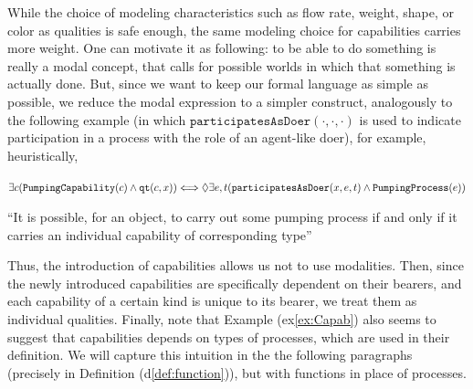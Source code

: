 \documentclass[sw]{iosart2x}
\newcommand{\bflist}{\begin{list}{}{\setlength{\topsep}{2mm}\setlength{\partopsep}{0mm}\setlength{\parsep}{0mm}\setlength{\leftmargin}{9mm}\setlength{\labelwidth}{8mm}}}
\newcommand{\eflist}{\end{list}}
\newcommand{\DefLabel}{\textrm{d}}
\newcommand{\ExLabel}{\textrm{ex}}
\newcommand{\myex}[1]{\refstepcounter{cntex}\begin{small}{\bf \ExLabel\thecntex\label{ex:#1}}\end{small}}
\newcounter{cntex}
\newcommand{\mytext}[1]{``#1''}
\newcommand{\refdf}[1]{({\DefLabel}\ref{#1})}
\newcommand{\refex}[1]{({\ExLabel}\ref{#1})}
\newcommand{\generalStyle}[1]{\texttt{#1}}
\newcommand{\biRel}[3]{\generalStyle{#1}(#2,#3)}
\newcommand{\uniRel}[2]{\generalStyle{#1}(#2)}
\newcommand{\triRel}[4]{\generalStyle{#1}(#2,#3,#4)}
\newcommand{\myiff}{\Longleftrightarrow}
\newcommand{\DOLCEQualityDirect}[2]{\biRel{qt}{#1}{#2}}
\newcommand{\PumpingCapability}[1]{\uniRel{PumpingCapability}{#1}}
\newcommand{\PumpingProcess}[1]{\uniRel{PumpingProcess}{#1}}
\newcommand{\participateAsDoer}[3]{\triRel{participatesAsDoer}{#1}{#2}{#3}}
\newcommand{\TODO}[1]{{\color{red} #1}}
\begin{document}
While the choice of modeling characteristics such as flow rate, weight, shape, or color as qualities is safe enough, the same modeling choice for capabilities carries more weight. 
One can motivate it as following: to be able to do something is really a modal concept, that calls for possible worlds in which that something is actually done. 
But, since we want to keep our formal language as simple as possible, we reduce the modal expression to a simpler construct, analogously to the following example (in which $\participateAsDoer{\cdot}{\cdot}{\cdot}$ is used to indicate participation in a process with the role of an agent-like doer), for example, heuristically,
\bflist
\item[\myex{Capab}] $ \exists c(\PumpingCapability{c} \land \DOLCEQualityDirect{c}{x}) \myiff \\
\mbox{} \hfill
\lozenge \exists e,t(\participateAsDoer{x}{e}{t} \land  \PumpingProcess{e}) $ 
\item \mytext{It is possible, for an object, to carry out some pumping process if and only if it carries an individual capability of corresponding type}
\eflist

Thus, the introduction of capabilities allows us not to use modalities. 
Then, since the newly introduced capabilities are specifically dependent on their bearers, and each capability of a certain kind is unique to its bearer, we treat them as individual qualities. 
Finally, note that Example \refex{ex:Capab} also seems to suggest that capabilities depends on types of processes, which are used in their definition. We will capture this intuition in the the following paragraphs (precisely in Definition \refdf{def:function}), but with functions in place of processes. 



\end{document}
